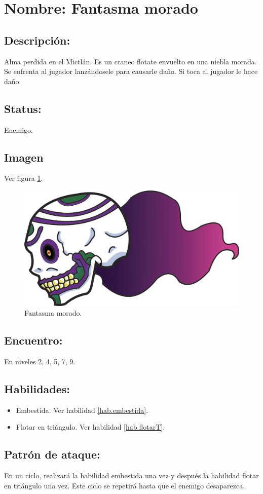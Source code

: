 \section{Nombre: Fantasma morado}   \label{per:fantasmaM}
\subsection{Descripción:}
Alma perdida en el Mictlán. Es un craneo flotate envuelto en una niebla morada.
Se enfrenta al jugador lanzándosele para causarle daño. Si toca al jugador le hace daño. 
\subsection{Status:}
Enemigo.
\subsection{Imagen}
Ver figura \ref{fig:fantasmaM}.
\begin{figure}
	\centering
	\includegraphics[height=0.2 \textheight]{Imagenes/fantasmaMorado}
	\caption{Fantasma morado.}
	\label{fig:fantasmaM}
\end{figure}
\subsection{Encuentro:}
En niveles 2, 4, 5, 7, 9.
\subsection{Habilidades:}
\begin{itemize}
	\item Embestida. Ver habilidad \ref{hab.embestida}.
	\item Flotar en triángulo. Ver habilidad \ref{hab.flotarT}.
\end{itemize}
\subsection{Patrón de ataque:}
En un ciclo, realizará la habilidad embestida una vez y después la habilidad flotar en triángulo una vez. Este ciclo se repetirá hasta que el enemigo desaparezca.